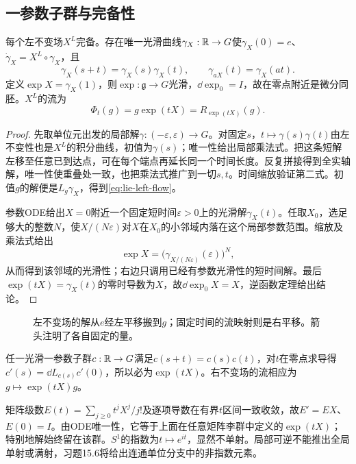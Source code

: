 \subsection{一参数子群与完备性}
\begin{theorem}\label{thm:lie-exponential}
每个左不变场$X^L$完备。存在唯一光滑曲线$\gamma_X:\mathbb{R}\to G$使$\gamma_X(0)=e$、$\dot\gamma_X=X^L\circ\gamma_X$，且
\[
 \gamma_X(s+t)=\gamma_X(s)\gamma_X(t),\qquad
 \gamma_{aX}(t)=\gamma_X(at).
\]
定义$\exp X=\gamma_X(1)$，则$\exp:\mathfrak g\to G$光滑，$\dd\exp_0=I$，故在零点附近是微分同胚。$X^L$的流为
\begin{equation}\label{eq:lie-left-flow}
 \Phi_t(g)=g\exp(tX)=R_{\exp(tX)}(g).
\end{equation}
\end{theorem}
\begin{proof}
先取单位元出发的局部解$\gamma:(-\varepsilon,\varepsilon)\to G$。对固定$s$，$t\mapsto\gamma(s)\gamma(t)$由左不变性也是$X^L$的积分曲线，初值为$\gamma(s)$；唯一性给出局部乘法式。把这条短解左移至任意已到达点，可在每个端点再延长同一个时间长度。反复拼接得到全实轴解，唯一性使重叠处一致，也把乘法式推广到一切$s,t$。时间缩放验证第二式。初值$g$的解便是$L_g\gamma_X$，得到\eqref{eq:lie-left-flow}。

参数ODE给出$X=0$附近一个固定短时间$\varepsilon>0$上的光滑解$\gamma_X(t)$。任取$X_0$，选足够大的整数$N$，使$X/(N\varepsilon)$对$X$在$X_0$的小邻域内落在这个局部参数范围。缩放及乘法式给出
\[
 \exp X=\bigl(\gamma_{X/(N\varepsilon)}(\varepsilon)\bigr)^N,
\]
从而得到该邻域的光滑性；右边只调用已经有参数光滑性的短时间解。最后$\exp(tX)=\gamma_X(t)$的零时导数为$X$，故$\dd\exp_0X=X$，逆函数定理给出结论。
\end{proof}

\begin{figure}[htbp]
\centering
\caption{左不变场的解从$e$经左平移搬到$g$；固定时间的流映射则是右平移。箭头注明了各自固定的量。}
\label{fig:lie-left-flow}
\end{figure}

任一光滑一参数子群$c:\mathbb{R}\to G$满足$c(s+t)=c(s)c(t)$，对$t$在零点求导得$c'(s)=\dd L_{c(s)}c'(0)$，所以必为$\exp(tX)$。右不变场的流相应为$g\mapsto\exp(tX)g$。

\begin{example}[矩阵指数]
矩阵级数$E(t)=\sum_{j\ge0}t^jX^j/j!$及逐项导数在有界$t$区间一致收敛，故$E'=EX$、$E(0)=I$。由ODE唯一性，它等于上面在任意矩阵李群中定义的$\exp(tX)$；特别地解始终留在该群。$S^1$的指数为$t\mapsto e^{it}$，显然不单射。局部可逆不能推出全局单射或满射，习题15.6将给出连通单位分支中的非指数元素。
\end{example}

